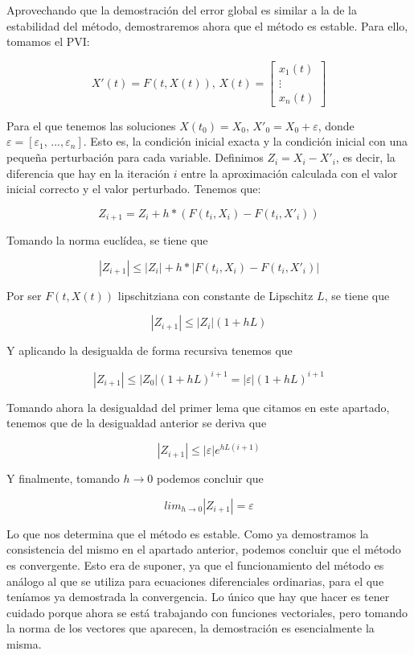 \documentclass[12pt]{article}       %
\begin{document}
Aprovechando que la demostración del error global es similar a la de la estabilidad del método, demostraremos ahora que el método es estable. Para ello, tomamos el PVI:

$$
X'(t)=F(t,X(t)), \, 
X(t)=\begin{bmatrix}
    x_1(t) \\
    \vdots \\
    x_n(t)
    \end{bmatrix}
$$

Para el que tenemos las soluciones $X(t_0) = X_0$, $X'_0 = X_0 + \varepsilon$, donde $\varepsilon = [\varepsilon_1, \, ..., \varepsilon_n]$. Esto es, la condición inicial exacta y la condición inicial con una pequeña perturbación para cada variable. Definimos $Z_i = X_i - X'_i$, es decir, la diferencia que hay en la iteración $i$ entre la aproximación calculada con el valor inicial correcto y el valor perturbado. Tenemos que:

$$Z_{i+1} = Z_i + h*(F(t_i, X_i) - F(t_i, X'_i)) $$

Tomando la norma euclídea, se tiene que   

$$|Z_{i+1}| \leq |Z_i| + h*|F(t_i, X_i) - F(t_i, X'_i)| $$

Por ser $F(t, X(t))$ lipschitziana con constante de Lipschitz $L$, se tiene que 

$$|Z_{i+1}| \leq |Z_i|(1 + hL)$$

Y aplicando la desigualda de forma recursiva tenemos que 

$$|Z_{i+1}| \leq |Z_0|(1 + hL)^{i+1} = |\varepsilon|(1 + hL)^{i+1} $$

Tomando ahora la desigualdad del primer lema que citamos en este apartado, tenemos que de la desigualdad anterior se deriva que 

$$|Z_{i+1}| \leq |\varepsilon|e^{hL(i+1)} $$

Y finalmente, tomando $h \rightarrow 0$ podemos concluir que 

$$ lim_{h \rightarrow 0} |Z_{i+1}| = \varepsilon $$

Lo que nos determina que el método es estable. Como ya demostramos la consistencia del mismo en el apartado anterior, podemos concluir que el método es convergente. Esto era de suponer, ya que el funcionamiento del método es análogo al que se utiliza para ecuaciones diferenciales ordinarias, para el que teníamos ya demostrada la convergencia. Lo único que hay que hacer es tener cuidado porque ahora se está trabajando con funciones vectoriales, pero tomando la norma de los vectores que aparecen, la demostración es esencialmente la misma.\\
\end{document}
